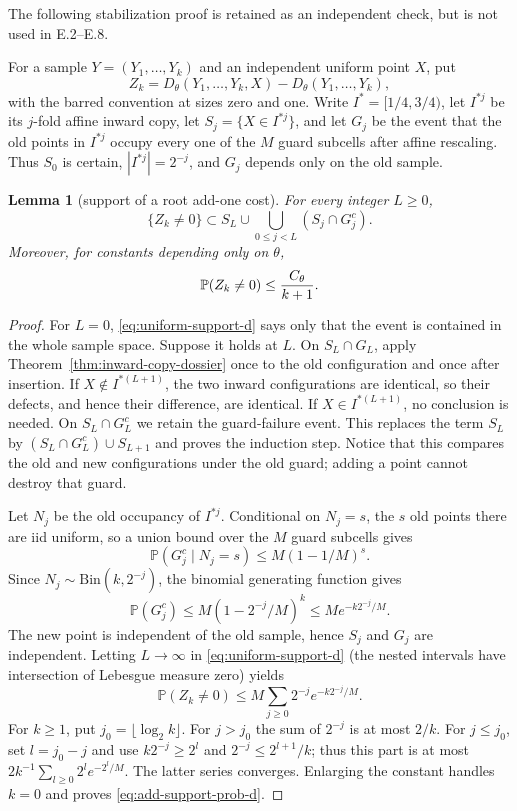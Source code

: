 \documentclass[11pt]{article}
\numberwithin{equation}{section}
\newtheorem{lemma}[theorem]{Lemma}
\newcommand{\1}{\mathbf 1}\newcommand{\F}{\mathcal F}\newcommand{\D}{\mathcal D}
\begin{document}
The following stabilization proof is retained as an independent check, but
is not used in E.2--E.8.

For a sample $Y=(Y_1,\ldots,Y_k)$ and an independent uniform point $X$, put
\[
 Z_k=D_\theta(Y_1,\ldots,Y_k,X)-D_\theta(Y_1,\ldots,Y_k),
\]
with the barred convention at sizes zero and one.  Write $I^*=[1/4,3/4)$,
let $I^{*j}$ be its $j$-fold affine inward copy, let
$S_j=\{X\in I^{*j}\}$, and let $G_j$ be the event that the old points in
$I^{*j}$ occupy every one of the $M$ guard subcells after affine rescaling.
Thus $S_0$ is certain, $|I^{*j}|=2^{-j}$, and $G_j$ depends only on the old
sample.

\begin{lemma}[support of a root add-one cost]\label{lem:uniform-support-d}
For every integer $L\ge0$,
\begin{equation}
 \{Z_k\ne0\}\subset S_L\cup\bigcup_{0\le j<L}(S_j\cap G_j^c). \label{eq:uniform-support-d}
\end{equation}
Moreover, for constants depending only on $\theta$,
\begin{equation}
 \mathbb P(Z_k\ne0)\le {C_\theta\over k+1}.                   \label{eq:add-support-prob-d}
\end{equation}
\end{lemma}
\begin{proof}
For $L=0$, \eqref{eq:uniform-support-d} says only that the event is contained
in the whole sample space.  Suppose it holds at $L$.  On
$S_L\cap G_L$, apply Theorem~\ref{thm:inward-copy-dossier} once to the old
configuration and once after insertion.  If $X\notin I^{*(L+1)}$, the two
inward configurations are identical, so their defects, and hence their
difference, are identical.  If $X\in I^{*(L+1)}$, no conclusion is needed.
On $S_L\cap G_L^c$ we retain the guard-failure event.  This replaces the term
$S_L$ by $(S_L\cap G_L^c)\cup S_{L+1}$ and proves the induction step.  Notice
that this compares the old and new configurations under the old guard; adding
a point cannot destroy that guard.

Let $N_j$ be the old occupancy of $I^{*j}$.  Conditional on $N_j=s$, the
$s$ old points there are iid uniform, so a union bound over the $M$ guard
subcells gives
\[
 \mathbb P(G_j^c\mid N_j=s)\le M(1-1/M)^s.
\]
Since $N_j\sim\mathrm{Bin}(k,2^{-j})$, the binomial generating function gives
\[
 \mathbb P(G_j^c)\le M(1-2^{-j}/M)^k\le M e^{-k2^{-j}/M}.
\]
The new point is independent of the old sample, hence $S_j$ and $G_j$ are
independent.  Letting $L\to\infty$ in \eqref{eq:uniform-support-d} (the
nested intervals have intersection of Lebesgue measure zero) yields
\[
 \mathbb P(Z_k\ne0)\le M\sum_{j\ge0}2^{-j}e^{-k2^{-j}/M}.
\]
For $k\ge1$, put $j_0=\lfloor\log_2 k\rfloor$.  For $j>j_0$ the sum of
$2^{-j}$ is at most $2/k$.  For $j\le j_0$, set $l=j_0-j$ and use
$k2^{-j}\ge2^l$ and $2^{-j}\le2^{l+1}/k$; thus this part is at most
$2k^{-1}\sum_{l\ge0}2^le^{-2^l/M}$.  The latter series converges.  Enlarging
the constant handles $k=0$ and proves \eqref{eq:add-support-prob-d}.
\end{proof}
\end{document}

